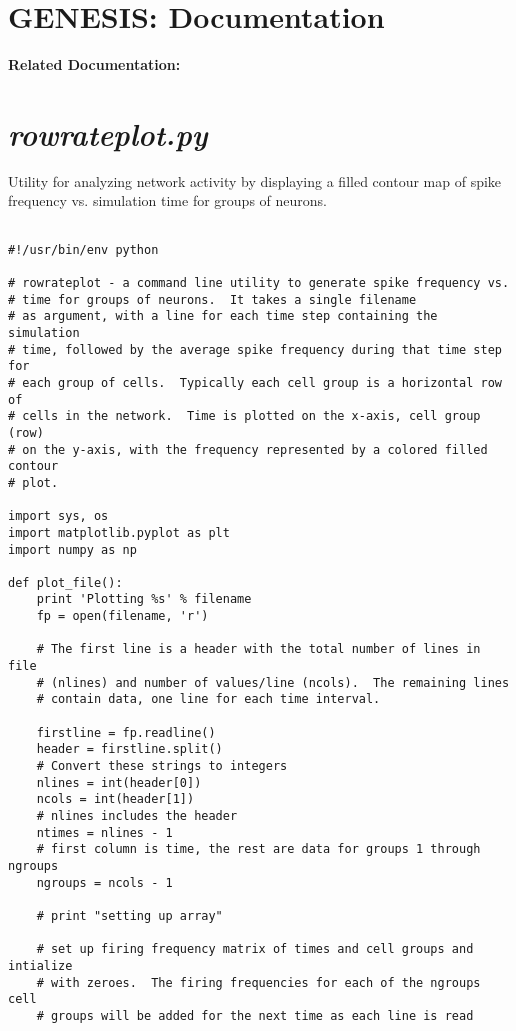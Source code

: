 \documentclass[12pt]{article}
\begin{document}
\section*{GENESIS: Documentation}

{\bf Related Documentation:}

\section*{\it rowrateplot.py}

Utility for analyzing network activity by
displaying a filled contour map of spike frequency vs. simulation time for
groups of neurons.

\begin{verbatim}

#!/usr/bin/env python

# rowrateplot - a command line utility to generate spike frequency vs.
# time for groups of neurons.  It takes a single filename
# as argument, with a line for each time step containing the simulation
# time, followed by the average spike frequency during that time step for
# each group of cells.  Typically each cell group is a horizontal row of
# cells in the network.  Time is plotted on the x-axis, cell group (row)
# on the y-axis, with the frequency represented by a colored filled contour
# plot.

import sys, os
import matplotlib.pyplot as plt
import numpy as np

def plot_file():
    print 'Plotting %s' % filename
    fp = open(filename, 'r')
 
    # The first line is a header with the total number of lines in file
    # (nlines) and number of values/line (ncols).  The remaining lines
    # contain data, one line for each time interval.

    firstline = fp.readline()
    header = firstline.split()
    # Convert these strings to integers
    nlines = int(header[0])
    ncols = int(header[1])
    # nlines includes the header
    ntimes = nlines - 1
    # first column is time, the rest are data for groups 1 through ngroups
    ngroups = ncols - 1

    # print "setting up array"

    # set up firing frequency matrix of times and cell groups and intialize
    # with zeroes.  The firing frequencies for each of the ngroups cell
    # groups will be added for the next time as each line is read


\end{verbatim}
\end{document}
